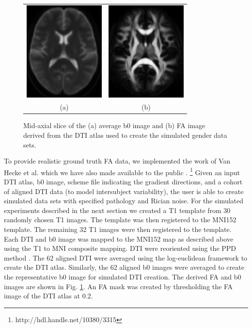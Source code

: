 \documentclass[final,5p,times,twocolumn]{elsarticle}
\begin{document}
\begin{figure}
\begin{center}
\begin{tabular}{cc}
  \includegraphics[width=41mm]{B0Average_slice85.png} & 
  \includegraphics[width=41mm]{DTIAverageFA_slice85.png} \\
  (a) & (b) 
\end{tabular}
\caption{Mid-axial slice of the (a) average b0 image and (b) FA image derived from the DTI atlas used
to create the simulated gender data sets.}
\label{fig:simulated}
\end{center}        
\end{figure}


To provide realistic ground truth FA data, we implemented 
the work of Van Hecke et al. \cite{van-hecke2009} which 
we have also made available to the public
\cite{Tustison2011}.%
\footnote{
http://hdl.handle.net/10380/3315
}  
Given an input DTI atlas, b0 image, scheme file indicating
the gradient directions, and 
a cohort of aligned DTI data (to model intersubject variability), the
user is able to create 
simulated data sets with specified pathology and Rician noise.
For the simulated experiments described in the next section we
created a T1 template from 30 randomly chosen T1 images.  The
template was then registered to the MNI152 template.  
The remaining 32 T1 images were then registered to the
template.  Each DTI and b0 image was mapped to the MNI152 map as 
described above using the T1 to MNI composite mapping.  DTI 
were reoriented using the PPD method \cite{alexander2001}.  The 62
aligned DTI were averaged using the log-euclidean framework 
\cite{arsigny2006} to create the DTI atlas.  Similarly, the 62 aligned
b0 images were averaged to create the representative b0 image
for simulated DTI creation.  The derived FA and b0 images are shown in 
Fig. \ref{fig:simulated}.  An FA mask was created by thresholding 
the FA image of the DTI atlas at 0.2.
\end{document}
